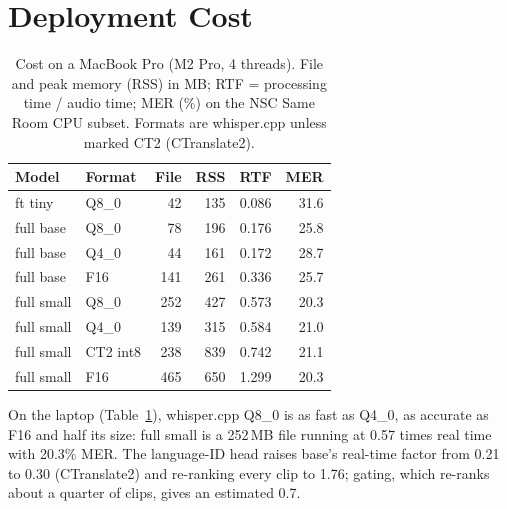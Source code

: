 \section{Deployment Cost}
\label{sec:deploy}

\begin{table}[t]
\centering
\small
\setlength{\tabcolsep}{3.5pt}
\begin{tabular}{llrrrr}
\toprule
Model & Format & File & RSS & RTF & MER \\
\midrule
ft tiny & Q8\_0 & 42 & 135 & 0.086 & 31.6 \\
full base & Q8\_0 & 78 & 196 & 0.176 & 25.8 \\
full base & Q4\_0 & 44 & 161 & 0.172 & 28.7 \\
full base & F16 & 141 & 261 & 0.336 & 25.7 \\
full small & Q8\_0 & 252 & 427 & 0.573 & 20.3 \\
full small & Q4\_0 & 139 & 315 & 0.584 & 21.0 \\
full small & CT2 int8 & 238 & 839 & 0.742 & 21.1 \\
full small & F16 & 465 & 650 & 1.299 & 20.3 \\
\bottomrule
\end{tabular}
\caption{Cost on a MacBook Pro (M2 Pro, 4 threads). File and peak memory (RSS) in MB; RTF = processing time / audio time; MER (\%) on the NSC Same Room CPU subset. Formats are whisper.cpp unless marked CT2 (CTranslate2).}
\label{tab:speed}
\end{table}



On the laptop (Table~\ref{tab:speed}), whisper.cpp Q8\_0 is as fast as Q4\_0, as accurate as F16 and half its size: full small is a 252\,MB file running at 0.57 times real time with 20.3\% MER. The language-ID head raises base's real-time factor from 0.21 to 0.30 (CTranslate2) and re-ranking every clip to 1.76; gating, which re-ranks about a quarter of clips, gives an estimated 0.7.
